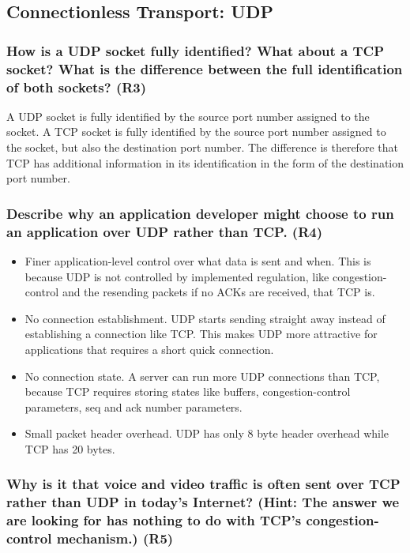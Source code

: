 \subsection{Connectionless Transport: UDP}

\subsubsection{How is a UDP socket fully identified? What about a TCP socket? What is the difference between the full identification of both sockets? (R3)}

A UDP socket is fully identified by the source port number assigned to the socket. A TCP socket is fully identified by the source port number assigned to the socket, but also the destination port number. The difference is therefore that TCP has additional information in its identification in the form of the destination port number.


\subsubsection{Describe why an application developer might choose to run an application over UDP rather than TCP. (R4)}

\begin{itemize}
    \item Finer application-level control over what data is sent and when. This is because UDP is not controlled by implemented regulation, like congestion-control and the resending packets if no ACKs are received, that TCP is.
    \item No connection establishment. UDP starts sending straight away instead of establishing a connection like TCP. This makes UDP more attractive for applications that requires a short quick connection.
    \item No connection state. A server can run more UDP connections than TCP, because TCP requires storing states like buffers, congestion-control parameters, seq and ack number parameters. 
    \item Small packet header overhead. UDP has only 8 byte header overhead while TCP has 20 bytes.
\end{itemize}


\subsubsection{Why is it that voice and video traffic is often sent over TCP rather than UDP in today's Internet? (Hint: The answer we are looking for has nothing to do with TCP's congestion-control mechanism.) (R5)}

